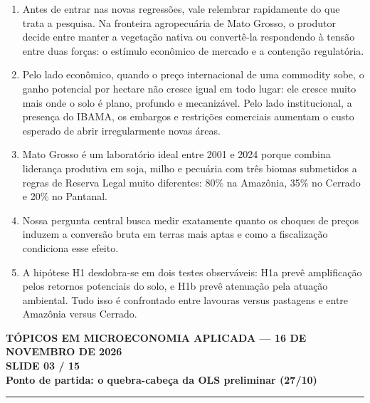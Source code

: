 \documentclass[11pt,a4paper]{article}
\newcommand{\slidenum}{1}
\begin{document}
\vspace{0.8mm}
\begin{enumerate}[leftmargin=*,label=\textbf{(\arabic*)},itemsep=2.8mm,topsep=1mm]
    \item Antes de entrar nas novas regressões, vale relembrar rapidamente do que trata a pesquisa. Na fronteira agropecuária de Mato Grosso, o produtor decide entre manter a vegetação nativa ou convertê-la respondendo à tensão entre duas forças: o estímulo econômico de mercado e a contenção regulatória.
    \item Pelo lado econômico, quando o preço internacional de uma commodity sobe, o ganho potencial por hectare não cresce igual em todo lugar: ele cresce muito mais onde o solo é plano, profundo e mecanizável. Pelo lado institucional, a presença do IBAMA, os embargos e restrições comerciais aumentam o custo esperado de abrir irregularmente novas áreas.
    \item Mato Grosso é um laboratório ideal entre 2001 e 2024 porque combina liderança produtiva em soja, milho e pecuária com três biomas submetidos a regras de Reserva Legal muito diferentes: 80\% na Amazônia, 35\% no Cerrado e 20\% no Pantanal.
    \item Nossa pergunta central busca medir exatamente quanto os choques de preços induzem a conversão bruta em terras mais aptas e como a fiscalização condiciona esse efeito.
    \item A hipótese H1 desdobra-se em dois testes observáveis: H1a prevê amplificação pelos retornos potenciais do solo, e H1b prevê atenuação pela atuação ambiental. Tudo isso é confrontado entre lavouras versus pastagens e entre Amazônia versus Cerrado.
\end{enumerate}

\newpage

\renewcommand{\slidenum}{3}
\noindent
\begin{minipage}{\textwidth}
\begin{center}
{\color{cinza}\footnotesize\textbf{TÓPICOS EM MICROECONOMIA APLICADA --- 16 DE NOVEMBRO DE 2026}\\[1.2mm]}
{\color{cinza}\bfseries\Large SLIDE 03 / 15\\[1.5mm]}
{\color{verde}\bfseries\LARGE Ponto de partida: o quebra-cabeça da OLS preliminar (27/10)\\[2.5mm]}
\rule{\textwidth}{1pt}
\end{center}
\end{minipage}
\vspace{1.5mm}
\end{document}
